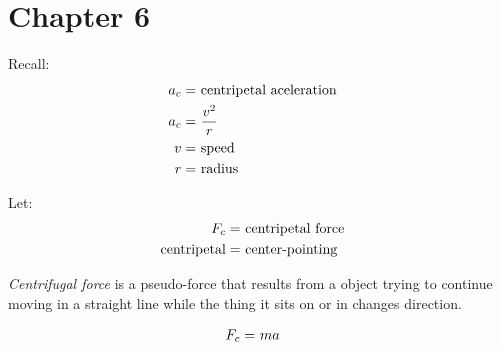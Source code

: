\section{Chapter 6}
	Recall:
	\begin{align}
		a_{c} = \ &\text{centripetal aceleration}& \notag \\
		a_{c} = \ &\frac{v^{2}}{r}& \notag \\
		v = \ &\text{speed}& \notag \\
		r = \ &\text{radius}& \notag
	\end{align}

	Let:
	\begin{align}
		F_{c} = \ &\text{centripetal force}& \notag \\
		\text{centripetal} = \ &\text{center-pointing}& \notag
	\end{align}

	\emph{Centrifugal force} is a pseudo-force that results from a object trying to continue moving in a straight line while the thing it sits on or in changes direction.

	\begin{align}
		F_{c} = \ &ma& \notag
	\end{align}
